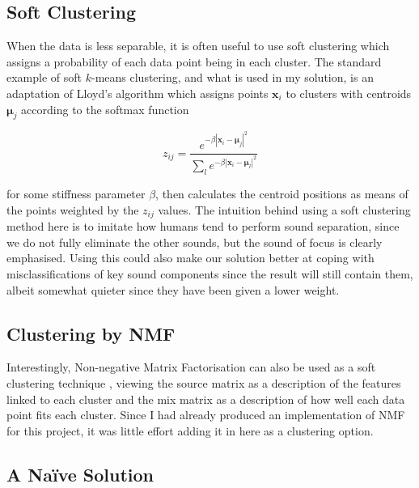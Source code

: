 \documentclass[12pt,a4paper,twoside,openright]{report}
\begin{document}
{\color{red}\subsection{Soft Clustering}}

When the data is less separable, it is often useful to use soft clustering which assigns a probability of each data point being in each cluster. The standard example of soft $ k $-means clustering, and what is used in my solution, is an adaptation of Lloyd's algorithm \cite{mackay2003information} which assigns points $ \mathbf{x}_i $ to clusters with centroids $ \mathbf{\mu}_j $ according to the softmax function

\begin{equation}
z_{ij} = \frac{e^{-\beta \left| \mathbf{x}_i - \mathbf{\mu}_j \right|^2}}{\sum_l e^{-\beta \left| \mathbf{x}_i - \mathbf{\mu}_l \right|^2}}
\end{equation}

for some stiffness parameter $ \beta $, then calculates the centroid positions as means of the points weighted by the $ z_{ij} $ values. The intuition behind using a soft clustering method here is to imitate how humans tend to perform sound separation, since we do not fully eliminate the other sounds, but the sound of focus is clearly emphasised. Using this could also make our solution better at coping with misclassifications of key sound components since the result will still contain them, albeit somewhat quieter since they have been given a lower weight.

{\color{red}\subsection{Clustering by NMF}}

Interestingly, Non-negative Matrix Factorisation can also be used as a soft clustering technique \cite{xu2003document}, viewing the source matrix as a description of the features linked to each cluster and the mix matrix as a description of how well each data point fits each cluster. Since I had already produced an implementation of NMF for this project, it was little effort adding it in here as a clustering option.

{\color{red}\subsection{A Na\"{i}ve Solution}}
\end{document}
